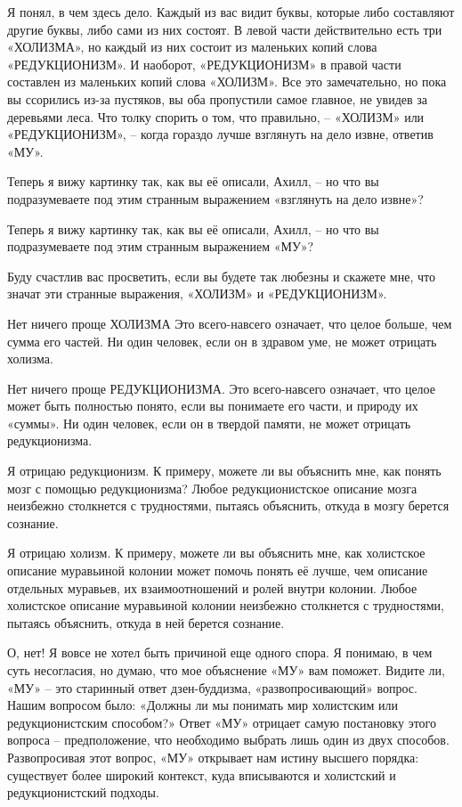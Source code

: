 \documentclass[../main.tex]{subfiles}
\begin{document}
\begin{dialogue}
 Я понял, в чем здесь дело. Каждый из вас видит буквы, которые либо составляют другие буквы, либо сами из них состоят. В левой части действительно есть три «ХОЛИЗМА», но каждый из них состоит из маленьких копий слова «РЕДУКЦИОНИЗМ». И наоборот, «РЕДУКЦИОНИЗМ» в правой части составлен из маленьких копий слова «ХОЛИЗМ». Все это замечательно, но пока вы ссорились из-за пустяков, вы оба пропустили самое главное, не увидев за деревьями леса. Что толку спорить о том, что правильно, \--- «ХОЛИЗМ» или «РЕДУКЦИОНИЗМ», \--- когда гораздо лучше взглянуть на дело извне, ответив «МУ».

 Теперь я вижу картинку так, как вы её описали, Ахилл, \--- но что вы подразумеваете под этим странным выражением «взглянуть на дело извне»?

 Теперь я вижу картинку так, как вы её описали, Ахилл, \--- но что вы подразумеваете под этим странным выражением «МУ»?

 Буду счастлив вас просветить, если вы будете так любезны и скажете мне, что значат эти странные выражения, «ХОЛИЗМ» и «РЕДУКЦИОНИЗМ».

 Нет ничего проще ХОЛИЗМА Это всего-навсего означает, что целое больше, чем сумма его частей. Ни один человек, если он в здравом уме, не может отрицать холизма.

 Нет ничего проще РЕДУКЦИОНИЗМА. Это всего-навсего означает, что целое может быть полностью понято, если вы понимаете его части, и природу их «суммы». Ни один человек, если он в твердой памяти, не может отрицать редукционизма.

 Я отрицаю редукционизм. К примеру, можете ли вы объяснить мне, как понять мозг с помощью редукционизма? Любое редукционистское описание мозга неизбежно столкнется с трудностями, пытаясь объяснить, откуда в мозгу берется сознание.

 Я отрицаю холизм. К примеру, можете ли вы объяснить мне, как холистское описание муравьиной колонии может помочь понять её лучше, чем описание отдельных муравьев, их взаимоотношений и ролей внутри колонии. Любое холистское описание муравьиной колонии неизбежно столкнется с трудностями, пытаясь объяснить, откуда в ней берется сознание.

 О, нет! Я вовсе не хотел быть причиной еще одного спора. Я понимаю, в чем суть несогласия, но думаю, что мое объяснение «МУ» вам поможет. Видите ли, «МУ» \--- это старинный ответ дзен-буддизма, «развопросивающий» вопрос. Нашим вопросом было: «Должны ли мы понимать мир холистским или редукционистским способом?» Ответ «МУ» отрицает самую постановку этого вопроса \--- предположение, что необходимо выбрать лишь один из двух способов. Развопросивая этот вопрос, «МУ» открывает нам истину высшего порядка: существует более широкий контекст, куда вписываются и холистский и редукционистский подходы.


\end{dialogue}
\end{document}
